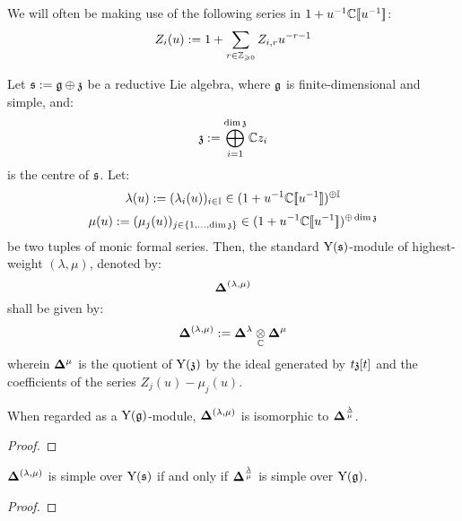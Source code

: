         \begin{convention}
            We will often be making use of the following series in $1 + u^{-1}\mathbb{C}[\![u^{-1}]\!]$:
                $$Z_i(u) := 1 + \sum_{r \in \mathbb{Z}_{\geqslant 0}} Z_{i, r} u^{-r - 1}$$
        \end{convention}
        \begin{definition} \label{def: standard_modules_for_finite_untwisted_yangians_of_reductive_lie_algebras}
            Let $\mathfrak{s} := \mathfrak{g} \oplus \mathfrak{z}$ be a reductive Lie algebra, where $\mathfrak{g}$ is finite-dimensional and simple, and:
                $$\mathfrak{z} := \bigoplus_{i = 1}^{\dim \mathfrak{z}} \mathbb{C} z_i$$
            is the centre of $\mathfrak{s}$. Let:
                $$\lambda(u) := ( \lambda_i(u) )_{i \in \mathbb{I}} \in (1 + u^{-1} \mathbb{C}[\![u^{-1}]\!])^{\oplus \mathbb{I}}$$
                $$\mu(u) := ( \mu_j(u) )_{j \in \{1, ..., \dim \mathfrak{z}\}} \in (1 + u^{-1} \mathbb{C}[\![u^{-1}]\!])^{\oplus \dim \mathfrak{z}}$$
            be two tuples of monic formal series. Then, the standard $\mathrm{Y}(\mathfrak{s})$-module of highest-weight $(\lambda, \mu)$, denoted by:
                $$\mathbf{ \Delta }^{(\lambda, \mu)}$$
            shall be given by:
                $$\qstandard^{(\lambda, \mu)} := \qstandard^{\lambda} \tensor_{\bbC} \qstandard^{\mu}$$
            wherein $\mathbf{ \Delta }^{\mu}$ is the quotient of $\mathrm{Y}(\mathfrak{z})$ by the ideal generated by $t\mathfrak{z}[t]$ and the coefficients of the series $Z_j(u) - \mu_j(u)$.
        \end{definition}
        
        \begin{proposition}
            When regarded as a $\mathrm{Y}(\mathfrak{g})$-module, $\mathbf{ \Delta }^{(\lambda, \mu)}$ is isomorphic to $\mathbf{ \Delta }^{\frac{\lambda}{\mu}}$. 
        \end{proposition}
            \begin{proof}
                
            \end{proof}
        \begin{corollary}
            $\mathbf{ \Delta }^{(\lambda, \mu)}$ is simple over $\mathrm{Y}(\mathfrak{s})$ if and only if $\mathbf{ \Delta }^{\frac{\lambda}{\mu}}$ is simple over $\mathrm{Y}(\mathfrak{g})$. 
        \end{corollary}
            \begin{proof}
                
            \end{proof}

